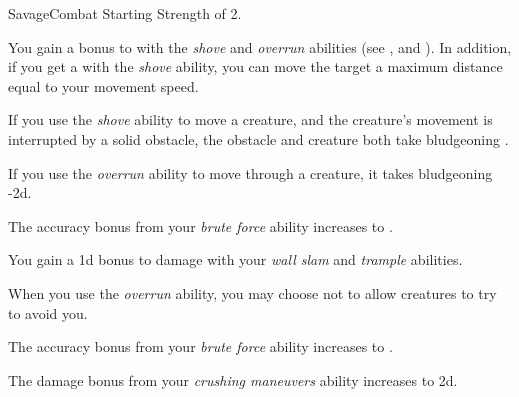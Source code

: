     \begin{feat}{Savage}{Combat}
        \featpre Starting Strength of 2.

         You gain a  bonus to  with the \textit{shove} and \textit{overrun} abilities (see , and ).
        In addition, if you get a  with the \textit{shove} ability, you can move the target a maximum distance equal to your movement speed.

         If you use the \textit{shove} ability to move a creature, and the creature's movement is interrupted by a solid obstacle, the obstacle and creature both take bludgeoning .

         If you use the \textit{overrun} ability to move through a creature, it takes bludgeoning  -2d.

         The accuracy bonus from your \textit{brute force} ability increases to .

         You gain a \plus1d bonus to damage with your \textit{wall slam} and \textit{trample} abilities.

         When you use the \textit{overrun} ability, you may choose not to allow creatures to try to avoid you.

         The accuracy bonus from your \textit{brute force} ability increases to .

         The damage bonus from your \textit{crushing maneuvers} ability increases to \plus2d.
    \end{feat}

